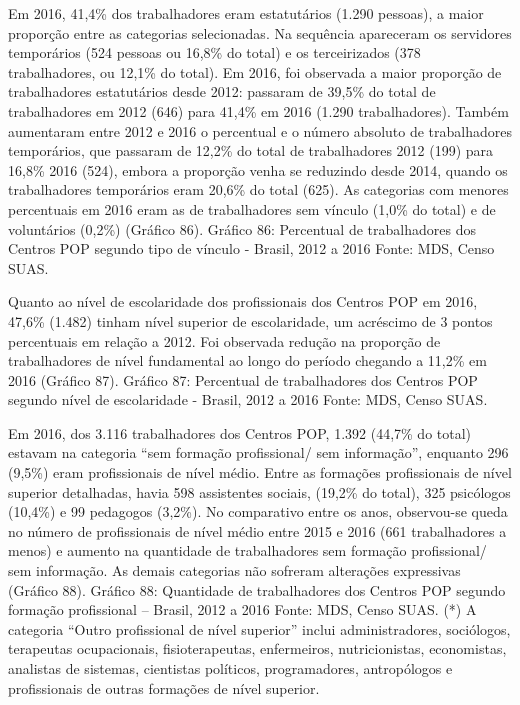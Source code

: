 \documentclass[
  brazilian]{report}
\begin{document}
Em 2016, 41,4\% dos trabalhadores eram estatutários (1.290 pessoas), a
maior proporção entre as categorias selecionadas. Na sequência
apareceram os servidores temporários (524 pessoas ou 16,8\% do total) e
os terceirizados (378 trabalhadores, ou 12,1\% do total). Em 2016, foi
observada a maior proporção de trabalhadores estatutários desde 2012:
passaram de 39,5\% do total de trabalhadores em 2012 (646) para 41,4\%
em 2016 (1.290 trabalhadores). Também aumentaram entre 2012 e 2016 o
percentual e o número absoluto de trabalhadores temporários, que
passaram de 12,2\% do total de trabalhadores 2012 (199) para 16,8\% 2016
(524), embora a proporção venha se reduzindo desde 2014, quando os
trabalhadores temporários eram 20,6\% do total (625). As categorias com
menores percentuais em 2016 eram as de trabalhadores sem vínculo (1,0\%
do total) e de voluntários (0,2\%) (Gráfico 86). Gráfico 86: Percentual
de trabalhadores dos Centros POP segundo tipo de vínculo - Brasil, 2012
a 2016 Fonte: MDS, Censo SUAS.

Quanto ao nível de escolaridade dos profissionais dos Centros POP em
2016, 47,6\% (1.482) tinham nível superior de escolaridade, um acréscimo
de 3 pontos percentuais em relação a 2012. Foi observada redução na
proporção de trabalhadores de nível fundamental ao longo do período
chegando a 11,2\% em 2016 (Gráfico 87). Gráfico 87: Percentual de
trabalhadores dos Centros POP segundo nível de escolaridade - Brasil,
2012 a 2016 Fonte: MDS, Censo SUAS.

Em 2016, dos 3.116 trabalhadores dos Centros POP, 1.392 (44,7\% do
total) estavam na categoria ``sem formação profissional/ sem
informação'', enquanto 296 (9,5\%) eram profissionais de nível médio.
Entre as formações profissionais de nível superior detalhadas, havia 598
assistentes sociais, (19,2\% do total), 325 psicólogos (10,4\%) e 99
pedagogos (3,2\%). No comparativo entre os anos, observou-se queda no
número de profissionais de nível médio entre 2015 e 2016 (661
trabalhadores a menos) e aumento na quantidade de trabalhadores sem
formação profissional/ sem informação. As demais categorias não sofreram
alterações expressivas (Gráfico 88). Gráfico 88: Quantidade de
trabalhadores dos Centros POP segundo formação profissional -- Brasil,
2012 a 2016 Fonte: MDS, Censo SUAS. (*) A categoria ``Outro profissional
de nível superior'' inclui administradores, sociólogos, terapeutas
ocupacionais, fisioterapeutas, enfermeiros, nutricionistas, economistas,
analistas de sistemas, cientistas políticos, programadores, antropólogos
e profissionais de outras formações de nível superior.
\end{document}
